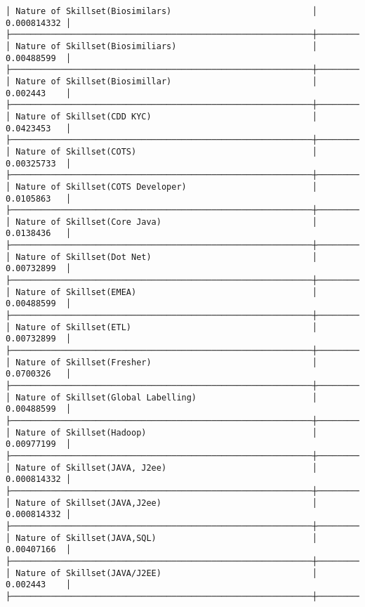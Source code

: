 \documentclass[11pt]{article}
\begin{document}
\begin{Verbatim}[commandchars=\\\{\}]
│ Nature of Skillset(Biosimilars)                            │ 0.000814332 │
├────────────────────────────────────────────────────────────┼─────────────┤
│ Nature of Skillset(Biosimiliars)                           │ 0.00488599  │
├────────────────────────────────────────────────────────────┼─────────────┤
│ Nature of Skillset(Biosimillar)                            │ 0.002443    │
├────────────────────────────────────────────────────────────┼─────────────┤
│ Nature of Skillset(CDD KYC)                                │ 0.0423453   │
├────────────────────────────────────────────────────────────┼─────────────┤
│ Nature of Skillset(COTS)                                   │ 0.00325733  │
├────────────────────────────────────────────────────────────┼─────────────┤
│ Nature of Skillset(COTS Developer)                         │ 0.0105863   │
├────────────────────────────────────────────────────────────┼─────────────┤
│ Nature of Skillset(Core Java)                              │ 0.0138436   │
├────────────────────────────────────────────────────────────┼─────────────┤
│ Nature of Skillset(Dot Net)                                │ 0.00732899  │
├────────────────────────────────────────────────────────────┼─────────────┤
│ Nature of Skillset(EMEA)                                   │ 0.00488599  │
├────────────────────────────────────────────────────────────┼─────────────┤
│ Nature of Skillset(ETL)                                    │ 0.00732899  │
├────────────────────────────────────────────────────────────┼─────────────┤
│ Nature of Skillset(Fresher)                                │ 0.0700326   │
├────────────────────────────────────────────────────────────┼─────────────┤
│ Nature of Skillset(Global Labelling)                       │ 0.00488599  │
├────────────────────────────────────────────────────────────┼─────────────┤
│ Nature of Skillset(Hadoop)                                 │ 0.00977199  │
├────────────────────────────────────────────────────────────┼─────────────┤
│ Nature of Skillset(JAVA, J2ee)                             │ 0.000814332 │
├────────────────────────────────────────────────────────────┼─────────────┤
│ Nature of Skillset(JAVA,J2ee)                              │ 0.000814332 │
├────────────────────────────────────────────────────────────┼─────────────┤
│ Nature of Skillset(JAVA,SQL)                               │ 0.00407166  │
├────────────────────────────────────────────────────────────┼─────────────┤
│ Nature of Skillset(JAVA/J2EE)                              │ 0.002443    │
├────────────────────────────────────────────────────────────┼─────────────┤

\end{Verbatim}
\end{document}
